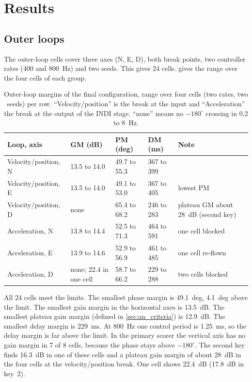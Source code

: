 \section{Results}\label{sec:an_results}

\subsection{Outer loops}\label{sec:an_outer}

The outer-loop cells cover three axes (N, E, D), both break points, two controller rates (400 and 800~Hz) and two seeds.
This gives 24 cells.
 gives the range over the four cells of each group.

\begin{table}[tbp]
\caption{Outer-loop margins of the final configuration, range over four cells (two rates, two seeds) per row. ``Velocity/position'' is the break at the input and ``Acceleration'' the break at the output of the INDI stage. ``none'' means no $-180^\circ$ crossing in 0.2 to 8~Hz.}\label{tab:an_outer}
\centering
\small
\begin{tabularx}{\textwidth}{@{}L{2.2cm} L{1.9cm} L{2.8cm} L{2.8cm} Y@{}}
\toprule
Loop, axis & GM (dB) & PM (deg) & DM (ms) & Note \\
\midrule
Velocity/position, N & 13.5 to 14.0 & 49.7 to 55.3 & 367 to 399 & \\
Velocity/position, E & 13.5 to 14.0 & 49.1 to 53.0 & 367 to 405 & lowest PM \\
Velocity/position, D & none & 65.4 to 68.2 & 246 to 283 & plateau GM about 28~dB (second key) \\
Acceleration, N & 13.8 to 14.4 & 52.5 to 71.3 & 464 to 591 & one cell blocked \\
Acceleration, E & 13.9 to 14.6 & 52.9 to 56.9 & 461 to 485 & one cell re-flown \\
Acceleration, D & none; 22.4 in one cell & 58.7 to 66.2 & 229 to 288 & two cells blocked \\
\bottomrule
\end{tabularx}
\end{table}

All 24 cells meet the limits.
The smallest phase margin is 49.1~deg, 4.1~deg above the limit.
The smallest gain margin in the horizontal axes is 13.5~dB.
The smallest plateau gain margin (defined in \cref{sec:an_criteria}) is 12.9~dB.
The smallest delay margin is 229~ms.
At 800~Hz one control period is 1.25~ms, so the delay margin is far above the limit.
In the primary scorer the vertical axis has no gain margin in 7 of 8 cells, because the phase stays above $-180^\circ$.
The second key finds 16.3~dB in one of these cells and a plateau gain margin of about 28~dB in the four cells at the velocity/position break.
One cell shows 22.4~dB (17.8~dB in key~2).

